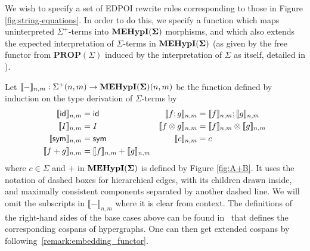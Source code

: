 We wish to specify a set of EDPOI rewrite rules corresponding to those in Figure \ref{fig:string-equations}.  In order to do this,  we specify a function which maps  uninterpreted $\Sigma^+$-terms into ${\mathbf{MEHypI(\Sigma)}}$ morphisms,  and which also extends the expected interpretation of $\Sigma$-terms in ${\mathbf{MEHypI(\Sigma)}}$ (as given by the free functor from $\textbf{PROP}(\Sigma)$ induced by the interpretation of $\Sigma$ as itself,  detailed in \cite{bonchi_string_2022-2}). 
\begin{definition}[Interpretation function] 
Let $\llbracket - \rrbracket_{n,m}: \Sigma^+(n,m) \to {\mathbf{MEHypI(\Sigma)}}(n,m)$ be the function defined by induction on the type derivation of $\Sigma$-terms by 
\begin{align*}
	\llbracket \textsf{id} \rrbracket_{n,m} &= \textsf{id}  &	\llbracket f ; g \rrbracket_{n,m} &= \llbracket f \rrbracket_{n,m} ; \llbracket g \rrbracket_{n,m} \\
	\llbracket I \rrbracket_{n,m} &= I & \llbracket f \otimes g \rrbracket_{n,m} &= \llbracket f \rrbracket_{n,m} \otimes \llbracket g \rrbracket_{n,m} \\
	\llbracket \textsf{sym} \rrbracket_{n,m} &= \textsf{sym}  & \llbracket c \rrbracket_{n,m} &= c   \\ 
	\llbracket f+g \rrbracket_{n,m} &= \llbracket f \rrbracket_{n,m} + \llbracket g \rrbracket_{n,m}
\end{align*}
where $c \in \Sigma$ and $+$ in ${\mathbf{MEHypI(\Sigma)}}$ is defined by Figure \ref{fig:A+B}.  It uses the notation of dashed boxes for hierarchical edges, with its children drawn inside,  and maximally consistent components separated by another dashed line.  We will omit the subscripts in $\llbracket - \rrbracket_{n,m}$ where it is clear from context.
The definitions of the right-hand sides of the base cases above can be found in~\cite{bonchi_string_2022-1} that defines the corresponding cospans of hypergraphs. One can then get extended cospans by following~\ref{remark:embedding_functor}.
\end{definition}

